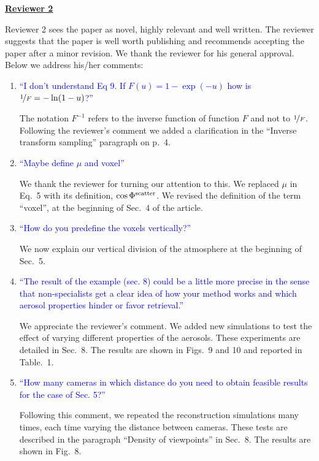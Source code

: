 \documentclass[12pt]{article}
\begin{document}
\newpage

\noindent \underline {\bf Reviewer 2}

Reviewer 2 sees the paper as novel, highly relevant and well written.
The reviewer suggests that the paper is well worth publishing and
recommends accepting the paper after a minor revision.  We thank the
reviewer for his general approval. Below we address his/her comments:

\begin{enumerate}

\item \textcolor{blue}{``I don’t understand Eq 9. If $F(u) =
    1-\exp(-u)$ how is $\nicefrac{1}{F} = -\ln(1-u)$?''}

  {The notation $F^{-1}$ refers to the inverse function
   of function $F$ and not to $\nicefrac{1}{F}$. Following the
   reviewer's comment we added a clarification in the ``Inverse
   transform sampling'' paragraph on p.~4. }

\item \textcolor{blue}{ ``Maybe define $\mu$ and voxel''}

  {We thank the reviewer for turning our attention to this.
   We replaced $\mu$ in Eq.~5 with its definition,
   $\cos \Phi^{\rm scatter}$. We revised the definition
   of the term ``voxel'', at the beginning of Sec.~4 of the
   article.}


\item \textcolor{blue}{ ``How do you predefine the voxels
    vertically?''}

  {
    We now explain our vertical division of the atmosphere at the
    beginning of Sec.~5.
  }


\item \textcolor{blue}{ ``The result of the example (sec. 8) could be
    a little more precise in the sense that non-specialists get a
    clear idea of how your method works and which aerosol properties
    hinder or favor retrieval.''}

  {
    We appreciate the reviewer's comment. We added new simulations to
    test the effect of varying different properties of the aerosols.
    These experiments are detailed in Sec.~8. The results are shown
    in Figs.~9 and 10 and reported in Table.~1.
  }


\item \textcolor{blue}{ ``How many cameras in which distance do you
    need to obtain feasible results for the case of Sec. 5?''}

  {Following this comment, we repeated the reconstruction
   simulations many times, each time varying the distance between
   cameras. These tests are described in the paragraph ``Density of viewpoints''
   in Sec.~8. The results are shown in Fig.~8.}

\end{enumerate}
\end{document}
